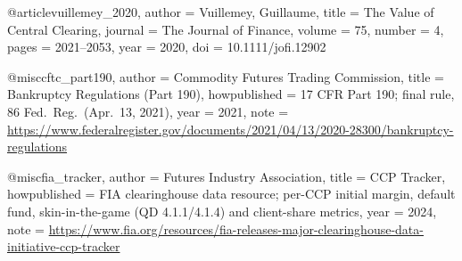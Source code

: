 
@article{vuillemey_2020,
  author  = {Vuillemey, Guillaume},
  title   = {The Value of Central Clearing},
  journal = {The Journal of Finance},
  volume  = {75},
  number  = {4},
  pages   = {2021--2053},
  year    = {2020},
  doi     = {10.1111/jofi.12902}
}

@misc{cftc_part190,
  author       = {{Commodity Futures Trading Commission}},
  title        = {Bankruptcy Regulations (Part 190)},
  howpublished = {17 CFR Part 190; final rule, 86 Fed.\ Reg.\ (Apr.\ 13, 2021)},
  year         = {2021},
  note         = {\url{https://www.federalregister.gov/documents/2021/04/13/2020-28300/bankruptcy-regulations}}
}




@misc{fia_tracker,
  author       = {{Futures Industry Association}},
  title        = {{CCP} Tracker},
  howpublished = {FIA clearinghouse data resource; per-CCP initial margin, default fund, skin-in-the-game (QD 4.1.1/4.1.4) and client-share metrics},
  year         = {2024},
  note         = {\url{https://www.fia.org/resources/fia-releases-major-clearinghouse-data-initiative-ccp-tracker}}
}

